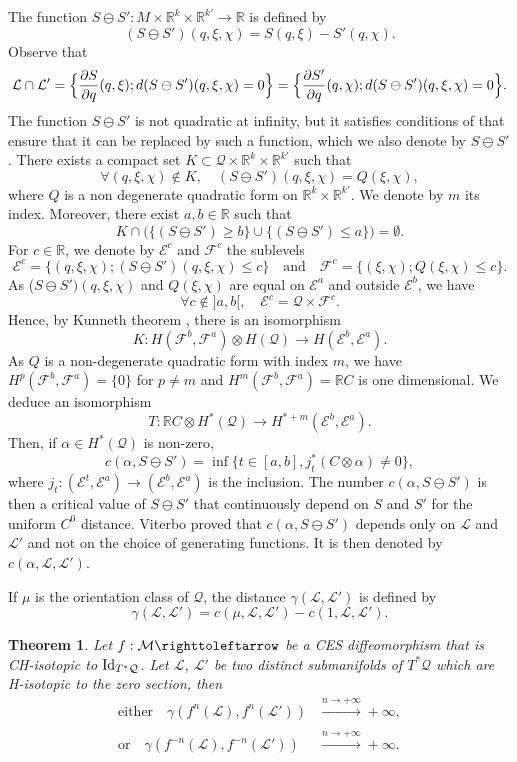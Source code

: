 \documentclass[10pt]{amsart}
\newtheorem{theorem}{Theorem}
\theoremstyle{definition}
\def\R{\mathbb{R}}
\def\cE{{\mathcal E}}
\def\cF{{\mathcal F}}
\def\cL{{\mathcal L}}
\def\cM{{\mathcal M}}
\def\cQ{{\mathcal Q}}
\begin{document}
The function $S\ominus S':M\times \R^k\times \R^{k'}\to \R$ is defined by
\[
(S\ominus S')(q, \xi, \chi)=S(q, \xi)-S'(q, \chi).
\]
Observe that
\[
\cL\cap\cL'=\Bigl\{\frac{\partial S}{\partial q}(q,\xi); d(S\ominus S')(q, \xi, \chi)=0\Bigr\}=\Bigl\{\frac{\partial S'}{\partial q}(q, \chi); d(S\ominus S')(q, \xi, \chi)=0\Bigr\}.
\]
The function $S\ominus S'$ is not quadratic at infinity, but it satisfies conditions of \cite[Prop.\,1.6.]{Vit2004} that ensure that it can be replaced by such a function, which we also denote by $S\ominus S'$.
There exists a compact set $K\subset \cQ\times \R^k\times \R^{k'}$ such that
\[
\forall (q, \xi, \chi)\notin K,\quad (S\ominus S')(q, \xi, \chi)=Q(\xi, \chi),
\]
where $Q$ is a non degenerate quadratic form on $\R^k\times \R^{k'}$. We denote by $m$ its index. Moreover, there exist $a, b\in\R$ such that
\[
K\cap \Big(\{ (S\ominus S')\geq b\}\cup \{ (S\ominus S')\leq a\}\Big)=\emptyset.
\]
For $c\in\R$, we denote by $\cE^c$ and $\cF^c$ the sublevels
\[
\cE^c=\{ (q, \xi, \chi); (S\ominus S')(q, \xi, \chi)\leq c\}\quad\text{and}\quad \cF^c=\{ (\xi, \chi); Q(\xi, \chi)\leq c\}.
\]
As ($S\ominus S')(q, \xi, \chi)$ and $Q(\xi, \chi)$ are equal on $\cE^a$ and outside $\cE^b$, we have
\[
\forall c\notin{}]a, b[,\quad \cE^c=\cQ\times \cF^c.
\]
Hence, by Kunneth theorem \cite{God1971},
there is an isomorphism
\[
K:H(\cF^b, \cF^a)\otimes H(\cQ)\to H(\cE^b, \cE^a).
\]
As $Q$ is a non-degenerate quadratic form with index $m$, we have $H^p(\cF^b, \cF^a)=\{ 0\}$ for $p\not=m$ and $H^m(\cF^b, \cF^a)=\R C$ is one dimensional. We deduce an isomorphism
\[
T:\R C\otimes H^*(\cQ)\to H^{*+m}(\cE^b, \cE^a).
\]
Then, if $\alpha\in H^*(\cQ)$ is non-zero,
\[
c(\alpha, S\ominus S')=\inf\{ t\in [a, b], j_t^*(C\otimes\alpha)\not=0\},
\]
where $j_t:(\cE^t, \cE^a)\to (\cE^b, \cE^a)$ is the inclusion. The number $c(\alpha, S\ominus S')$ is then a critical value of $S\ominus S'$ that continuously depend on $S$ and $S'$ for the uniform $C^0$ distance.
Viterbo proved that $c(\alpha, S\ominus S')$ depends only on $\cL$ and $\cL'$ and not on the choice of generating functions. It is then denoted by $c(\alpha, \cL, \cL')$.

If $\mu$ is the orientation class of $\cQ$, the distance $\gamma(\cL,\cL')$ is defined by
\[
\gamma(\cL, \cL')=c(\mu, \cL, \cL')-c(1, \cL, \cL').
\]

\begin{theorem}\label{Tconformgamma}
Let $f: \cM \righttoleftarrow$ be a CES diffeomorphism that is CH-isotopic to ${\rm Id}_{T^*\cQ}$. Let $\cL$, $\cL'$ be two distinct submanifolds of $T^*\cQ$ which are H-isotopic to the zero section, then
\begin{align*}
\text{either}\quad\gamma (f^n(\cL), f^n(\cL'))&\xrightarrow[]{n\to +\infty}+\infty,\\
\text{or}\quad\gamma (f^{-n}(\cL), f^{-n}(\cL'))&\xrightarrow[]{n\to +\infty}+\infty.
\end{align*}
\end{theorem}
\end{document}
